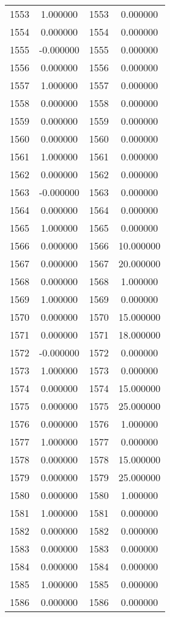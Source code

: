 \documentclass[12pt]{article}
\begin{document}
\begin{longtable}{@{}cccc@{}}
1553 & 1.000000 & 1553 & 0.000000 \\
1554 & 0.000000 & 1554 & 0.000000 \\
1555 & -0.000000 & 1555 & 0.000000 \\
1556 & 0.000000 & 1556 & 0.000000 \\
1557 & 1.000000 & 1557 & 0.000000 \\
1558 & 0.000000 & 1558 & 0.000000 \\
1559 & 0.000000 & 1559 & 0.000000 \\
1560 & 0.000000 & 1560 & 0.000000 \\
1561 & 1.000000 & 1561 & 0.000000 \\
1562 & 0.000000 & 1562 & 0.000000 \\
1563 & -0.000000 & 1563 & 0.000000 \\
1564 & 0.000000 & 1564 & 0.000000 \\
1565 & 1.000000 & 1565 & 0.000000 \\
1566 & 0.000000 & 1566 & 10.000000 \\
1567 & 0.000000 & 1567 & 20.000000 \\
1568 & 0.000000 & 1568 & 1.000000 \\
1569 & 1.000000 & 1569 & 0.000000 \\
1570 & 0.000000 & 1570 & 15.000000 \\
1571 & 0.000000 & 1571 & 18.000000 \\
1572 & -0.000000 & 1572 & 0.000000 \\
1573 & 1.000000 & 1573 & 0.000000 \\
1574 & 0.000000 & 1574 & 15.000000 \\
1575 & 0.000000 & 1575 & 25.000000 \\
1576 & 0.000000 & 1576 & 1.000000 \\
1577 & 1.000000 & 1577 & 0.000000 \\
1578 & 0.000000 & 1578 & 15.000000 \\
1579 & 0.000000 & 1579 & 25.000000 \\
1580 & 0.000000 & 1580 & 1.000000 \\
1581 & 1.000000 & 1581 & 0.000000 \\
1582 & 0.000000 & 1582 & 0.000000 \\
1583 & 0.000000 & 1583 & 0.000000 \\
1584 & 0.000000 & 1584 & 0.000000 \\
1585 & 1.000000 & 1585 & 0.000000 \\
1586 & 0.000000 & 1586 & 0.000000 \\

\end{longtable}
\end{document}
